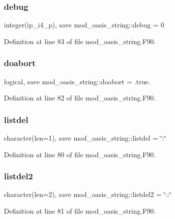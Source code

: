 \subsubsection{\texorpdfstring{debug}{debug}}
{\footnotesize\ttfamily integer(ip\+\_\+i4\+\_\+p), save mod\+\_\+oasis\+\_\+string\+::debug = 0\hspace{0.3cm}{\ttfamily [private]}}



Definition at line 83 of file mod\+\_\+oasis\+\_\+string.\+F90.

\mbox{\label{namespacemod__oasis__string_a59e9b1145c7c14506941e6495b237395}} 
\subsubsection{\texorpdfstring{doabort}{doabort}}
{\footnotesize\ttfamily logical, save mod\+\_\+oasis\+\_\+string\+::doabort = .true.\hspace{0.3cm}{\ttfamily [private]}}



Definition at line 82 of file mod\+\_\+oasis\+\_\+string.\+F90.

\mbox{\label{namespacemod__oasis__string_aa6f905efb4869a52d8bb2414e82bb0a7}} 
\subsubsection{\texorpdfstring{listdel}{listdel}}
{\footnotesize\ttfamily character(len=1), save mod\+\_\+oasis\+\_\+string\+::listdel = \char`\"{}\+:\char`\"{}\hspace{0.3cm}{\ttfamily [private]}}



Definition at line 80 of file mod\+\_\+oasis\+\_\+string.\+F90.

\mbox{\label{namespacemod__oasis__string_a9b40ad6f4785bd4765a24b6337185513}} 
\subsubsection{\texorpdfstring{listdel2}{listdel2}}
{\footnotesize\ttfamily character(len=2), save mod\+\_\+oasis\+\_\+string\+::listdel2 = \char`\"{}\+::\char`\"{}\hspace{0.3cm}{\ttfamily [private]}}



Definition at line 81 of file mod\+\_\+oasis\+\_\+string.\+F90.

